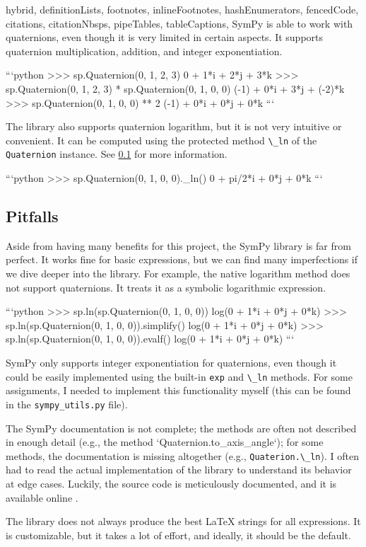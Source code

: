 \begin{markdown*}{%
  hybrid,
  definitionLists,
  footnotes,
  inlineFootnotes,
  hashEnumerators,
  fencedCode,
  citations,
  citationNbsps,
  pipeTables,
  tableCaptions,
}
SymPy is able to work with quaternions, even though it is very limited in certain aspects. It supports quaternion multiplication, addition, and integer exponentiation.  

```python
>>> sp.Quaternion(0, 1, 2, 3)
0 + 1*i + 2*j + 3*k
>>> sp.Quaternion(0, 1, 2, 3) * sp.Quaternion(0, 1, 0, 0)
(-1) + 0*i + 3*j + (-2)*k
>>> sp.Quaternion(0, 1, 0, 0) ** 2
(-1) + 0*i + 0*j + 0*k
```

The library also supports quaternion logarithm, but it is not very intuitive or convenient. It can be computed using the protected method \verb|\_ln| of the \verb|Quaternion| instance. See \ref{subsection:pitfalls} for more information.

```python
>>> sp.Quaternion(0, 1, 0, 0)._ln()
0 + pi/2*i + 0*j + 0*k
```

\subsection{Pitfalls}
\label{subsection:pitfalls}

Aside from having many benefits for this project, the SymPy library is far from perfect. It works fine for basic expressions, but we can find many imperfections if we dive deeper into the library. For example, the native logarithm method does not support quaternions. It treats it as a symbolic logarithmic expression.

```python
>>> sp.ln(sp.Quaternion(0, 1, 0, 0))
log(0 + 1*i + 0*j + 0*k)
>>> sp.ln(sp.Quaternion(0, 1, 0, 0)).simplify()
log(0 + 1*i + 0*j + 0*k)
>>> sp.ln(sp.Quaternion(0, 1, 0, 0)).evalf()
log(0 + 1*i + 0*j + 0*k)
```

SymPy only supports integer exponentiation for quaternions, even though it could be easily implemented using the built-in \verb|exp| and \verb|\_ln| methods. For some assignments, I needed to implement this functionality myself (this can be found in the \verb|sympy_utils.py| file).

The SymPy documentation is not complete; the methods are often not described in enough detail (e.g., the method `Quaternion.to_axis_angle`); for some methods, the documentation is missing altogether (e.g., \verb|Quaterion.\_ln|). I often had to read the actual implementation of the library to understand its behavior at edge cases. Luckily, the source code is meticulously documented, and it is available online \cite{sympy_source}. 

The library does not always produce the best \LaTeX{} strings for all expressions. It is customizable, but it takes a lot of effort, and ideally, it should be the default.


\end{markdown*}
